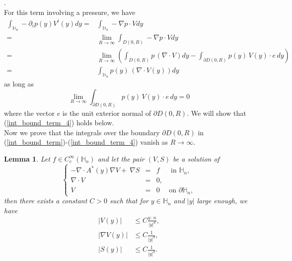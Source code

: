 \documentclass[11pt, reqno]{amsart}
\newtheorem{lemma}[theorem]{Lemma}
\theoremstyle{definition}
\theoremstyle{remark}
\numberwithin{equation}{section}
\begin{document}
\begin{appendices}
		.\\ 
		For this term involving a pressure, we have 
		\begin{align*}
			\int_{\mathbb{H}_n} - \partial_i p(y) V^i(y) dy=&	\int_{ \mathbb{H}_n }  - \nabla p \cdot V dy\\
			=&\lim_{R\rightarrow\infty}	\int_{D(0,R)}  - \nabla p \cdot V dy\\
			=& \lim_{R\rightarrow\infty} \left(\int_{D(0,R)}  p\,  (\nabla \cdot  V )dy -\int_{\partial D(0,R)  }   p (y)\,   V(y)  \cdot e \,  dy \right)\\
			=&  \int_{ \mathbb{H}_n}  p(y)\,  (\nabla \cdot  V (y))   dy  
		\end{align*}
		as long as 
		\begin{equation}\label{int_bound_term_4}
			\lim_{R\rightarrow\infty} 	\int_{\partial D(0,R)}   p(y) \,  V(y) \cdot e \, dy =0 
		\end{equation}
		where the vector $e$ is the unit exterior normal of $\partial D(0,R)$.
			We will show that (\ref{int_bound_term_4}) holds below.\\
			
			
		\noindent Now we prove that the integrals  over the boundary $ \partial D(0,R)$ in (\ref{int_bound_term})-(\ref{int_bound_term_4})   vanish as $R\rightarrow\infty$.
	\begin{lemma}
			Let 
			$f\in C^\infty_c(  \mathbb{H}_n )$ and let the pair $(V,S)$ be a solution of
			\begin{equation}\label{Stokes_VS}
				\left\{
				\begin{array}{rcl}
					-\nabla\cdot A^* (y) \nabla V + \:  \nabla S&=& f \;\quad \mbox{ in }  \mathbb{H}_n,\\
					\nabla\cdot V&=& 0  ,\\
					V	&=& 0  \quad \mbox{ on }  \partial\mathbb{H}_n ,
				\end{array}
				\right. 
			\end{equation}   
			then there exists a constant $C>0$ such that  for  $y\in\mathbb{H}_n  $ and $|y|$ large enough, we have
			\begin{align}
				|V(y)| &\leq C \frac{y\cdot n}{|y|^d}\label{estim_V}, \\
				|\nabla V(y)| &\leq C \frac{1}{|y|^d},\label{estim_nab_V} \\
				|S(y)| &\leq C \frac{1}{|y|^d}.\label{estim_on_R}
			\end{align}
		\end{lemma}
	

\end{appendices}
\end{document}
